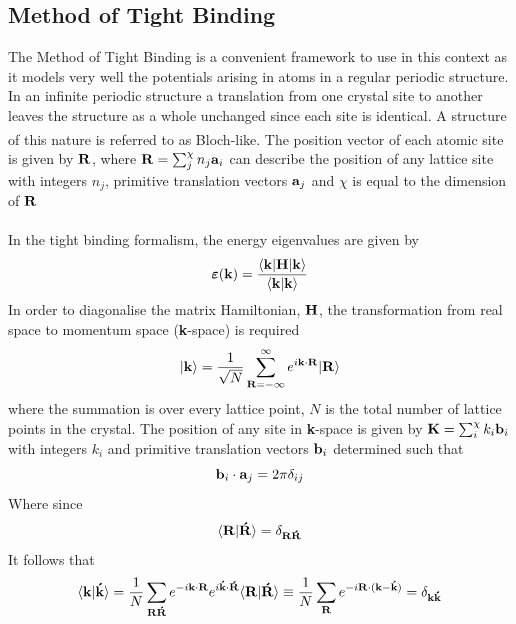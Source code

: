 \documentclass[a4paper, 12pt]{article}
\begin{document}
	\subsection{Method of Tight Binding}\label{tb}
	The Method of Tight Binding is a convenient framework to use in this context as it models very well the potentials arising in atoms in a regular periodic structure. 
	In an infinite periodic structure a translation from one crystal site to another leaves the structure as a whole unchanged since each site is identical. A structure of this nature is referred to as Bloch-like\textsuperscript{\textcolor{blue}{\cite{kittel_1996}}}.
	The position vector of each atomic site is given by $\bf R$,
		where ${\bf R} = \sum_j^\chi n_j{\bf a}_i$ can describe the position of any lattice site with integers $n_j$, primitive translation vectors ${\bf a}_j$ and $\chi$ is equal to the dimension of $\bf R$ \\ 
		\\In the tight binding formalism, the energy eigenvalues are given by 
		\begin{equation}
			\bm\varepsilon({\bf k}) = \frac{\langle {\bf k}|{\bf H}|{\bf k} \rangle}{\langle\bf k|k\rangle}
		\end{equation}
		In order to diagonalise the matrix Hamiltonian, $\bf H$, the transformation from real space to momentum space ({\bf k}-space) is required
		\begin{equation}\label{kkk}
			|{\bf k}\rangle = \frac{1}{\sqrt{N}}\sum_{\bf R = -\infty}^\infty e^{i{\bf k}\cdot \bf R} |\bf R\rangle
		\end{equation}
		where the summation is over every lattice point, $N$ is the total number of lattice points in the crystal. The position of any site in {\bf k}-space is given by ${\bf K} = \sum_i^\chi k_i{\bf b}_i$ with integers $k_i$ and primitive translation vectors ${\bf b}_i$ determined such that 
		\begin{equation}
		{\bf b}_i\cdot {\bf a}_j = 2\pi \delta_{i j}
			\label{ab}
		\end{equation}
Where since 
		\begin{equation}
			\langle{\bf R}|{\bf \acute{R}}\rangle = \delta_{\bf R \acute{R}}
		\end{equation}
		It follows that
		\begin{equation}
			\label{kk}
			\langle{\bf k}|{\bf \acute{k}}\rangle = \frac{1}{N}\sum_{\bf R \acute{R}} e^{-i{\bf k}\cdot{\bf R}}e^{i{\bf \acute{k}}\cdot{\bf \acute{R}}} \langle{\bf R | \acute{R}}\rangle \equiv \frac{1}{N}\sum_{\bf R} e^{-i{\bf R\cdot(k-\acute{k})}}=\delta_{\bf k \acute{k}}
		\end{equation}
\end{document}

